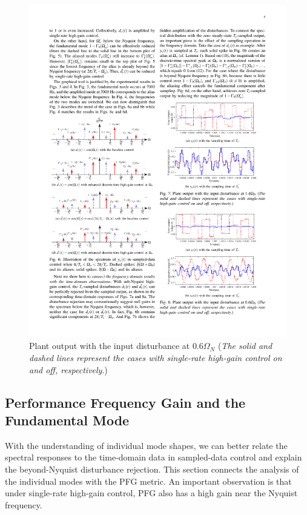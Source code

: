 \documentclass [11pt, proquest] {uwthesis}[2020/02/24]
\begin{document}
\begin{figure}[!ht]
\begin{centering}
{\begin{centering}
\includegraphics[width=13cm]{Spectral-analysis/FIG8b.pdf}
\par\end{centering}
}
\par\end{centering}
\caption{\label{fig:Plant-output-for-4}Plant output with the input disturbance
at $0.6\Omega_{N}$ (\emph{The solid and dashed lines represent the
cases with single-rate high-gain control on and off, respectively}.)}
\end{figure}

\subsection{Performance Frequency Gain and the Fundamental Mode}

With the understanding of individual mode shapes, we can better relate
the spectral responses to the time-domain data in sampled-data control
and explain the beyond-Nyquist disturbance rejection. This section
connects the analysis of the individual modes with the PFG metric.
An important observation is that under single-rate high-gain control,
PFG also has a high gain near the Nyquist frequency.
\end{document}
